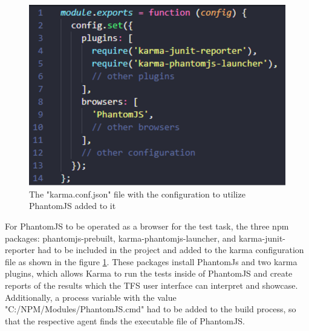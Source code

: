 \documentclass[Bachelor,BIF,english]{twbook}
\begin{document}
\\[\baselineskip]
\begin{figure}[!htbp]
\centering
\includegraphics[width=0.5\linewidth]{PICs/karma_phantomjs.eps}
\caption{The "karma.conf.json" file with the configuration to utilize PhantomJS added to it}\label{Fig3}
\end{figure}

For PhantomJS to be operated as a browser for the test task, the three npm packages: phantomjs-prebuilt, karma-phantomjs-launcher, and karma-junit-reporter had to be included in the project and added to the karma configuration file as shown in the figure \ref{Fig3}. These packages install PhantomJs and two karma plugins, which allows Karma to run the tests inside of PhantomJS and create reports of the results which the TFS user interface can interpret and showcase. Additionally, a process variable with the value "C:/NPM/Modules/PhantomJS.cmd" had to be added to the build process, so that the respective agent finds the executable file of PhantomJS.
\end{document}
